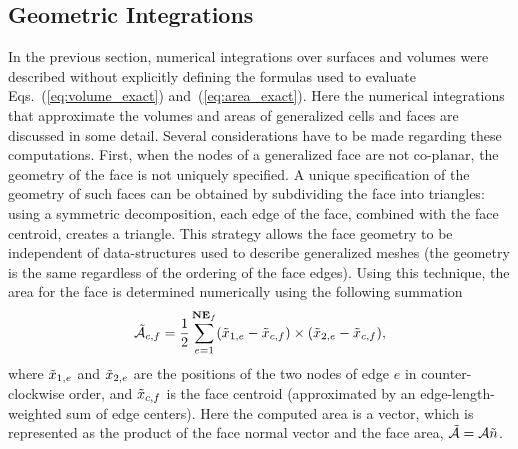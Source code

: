\subsection{Geometric Integrations}

In the previous section, numerical integrations over surfaces and
volumes were described without explicitly defining the formulas
used to evaluate Eqs.~(\ref{eq:volume_exact}) and~(\ref{eq:area_exact}).
Here the numerical integrations that approximate the volumes and areas
of generalized cells and faces are discussed in some detail.
Several considerations have to be made regarding
these computations.  First, when the nodes of a generalized face are
not co-planar, the geometry of the face is not uniquely specified.
A unique specification of the geometry of such faces can be obtained
by subdividing the face into triangles: using a symmetric decomposition, each
edge of the face, combined with the face centroid, creates a triangle.
This strategy allows the face geometry to be independent of
data-structures used to describe generalized meshes (the geometry is
the same regardless of the ordering of the face edges).  Using this
technique, the area for the face is determined numerically using the
following summation
\begin{equation}
\Tilde{\mathcal{A}}_{c,f} = \frac{1}{2} \sum_{e=1}^{\mathbf{NE}_f} 
(\Tilde{x}_{1,e}-\Tilde{x}_{c,f})\times(\Tilde{x}_{2,e}-\Tilde{x}_{c,f}),
\label{eq:face_area}
\end{equation}
where $\Tilde{x}_{1,e}$ and $\Tilde{x}_{2,e}$ are the positions of the
two nodes of edge $e$ in counter-clockwise order, and $\Tilde{x}_{c,f}$
is the face centroid (approximated by an edge-length-weighted sum of
edge centers).  Here the computed area is a vector, which is represented
as the product of the face normal vector and the face area,
$\Tilde{\mathcal{A}} = \mathcal{A} \Tilde{n}$.

